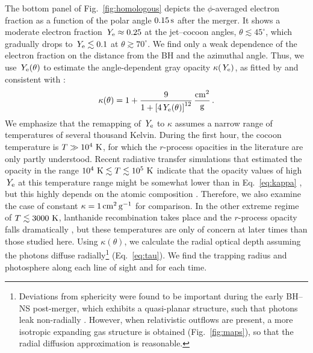 \documentclass[twocolumn,dvipsnames]{aastex62}
\newcommand{\Ye}{\,{Y_{\rm e}}}
\begin{document}
The bottom panel of Fig.~\ref{fig:homologous} depicts the $ \phi$-averaged electron fraction as a function of the polar angle $ 0.15\,{\rm s} $ after the merger. It shows a moderate electron fraction $ \Ye \approx 0.25 $ at the jet--cocoon angles, $ \theta \lesssim 45^\circ $, which gradually drops to $ \Ye \lesssim 0.1 $ at $ \theta \gtrsim 70^\circ $. We find only a weak dependence of the electron fraction on the distance from the BH and the azimuthal angle. Thus, we use $ \Ye(\theta) $ to estimate the angle-dependent gray opacity $ \kappa(\Ye) $, as fitted by \citet{Wu2022} and consistent with \citet{Tanaka2020}:
\begin{equation}\label{eq:kappa}
    \kappa(\theta) = 1+\frac{9}{1+\left[4\Ye(\theta)\right]^{12}}\,{\rm \frac{cm^2}{g}}\,.
\end{equation}
We emphasize that the remapping of $ \Ye $ to $ \kappa $ assumes a narrow range of temperatures of several thousand Kelvin. During the first hour, the cocoon temperature is $ T \gg 10^4~{\rm K} $, for which the $r$-process opacities in the literature are only partly understood. Recent radiative transfer simulations that estimated the opacity in the range $ 10^4~{\rm K} \lesssim T \lesssim 10^5~{\rm K} $ indicate that the opacity values of high $ \Ye $ at this temperature range might be somewhat lower than in Eq.~\eqref{eq:kappa} \citep[see figure 7 in][]{Banerjee2020}, but this highly depends on the atomic composition \citep{Banerjee2023}. Therefore, we also examine the case of constant $ \kappa = 1\,{\rm cm^2\,g^{-1}} $ for comparison. In the other extreme regime of $ T \lesssim 3000~{\rm K} $, lanthanide recombination takes place and the $r$-process opacity falls dramatically \citep{Kasen2013}, but these temperatures are only of concern at later times than those studied here. Using $ \kappa(\theta) $, we calculate the radial optical depth assuming the photons diffuse radially\footnote{Deviations from sphericity were found to be important during the early BH--NS post-merger, which exhibits a quasi-planar structure, such that photons leak non-radially \citep{Kawaguchi2016,Darbha2020,Darbha2021}. However, when relativistic outflows are present, a more isotropic expanding gas structure is obtained (Fig.~\ref{fig:maps}), so that the radial diffusion approximation is reasonable.}  (Eq.~\eqref{eq:tau}). We find the trapping radius and photosphere along each line of sight and for each time.
\end{document}

